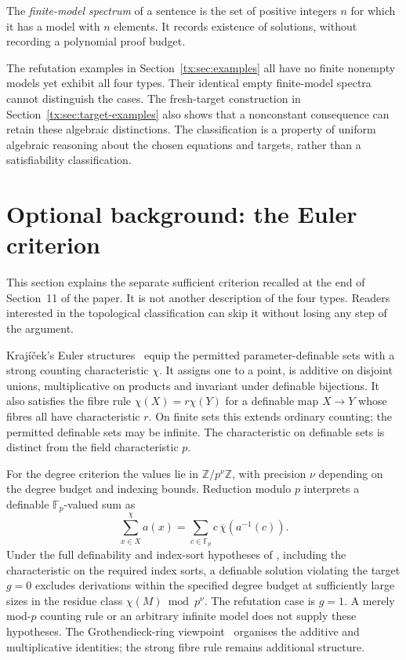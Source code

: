 \documentclass[11pt,a4paper,oneside,openany]{book}
\theoremstyle{definition}\newtheorem{definition}[theorem]{Definition}
\theoremstyle{remark}\newtheorem{remark}[theorem]{Remark}
\numberwithin{equation}{chapter}
\begin{document}
The \emph{finite-model spectrum} of a sentence is the set of positive
integers $n$ for which it has a model with $n$ elements. It records
existence of solutions, without recording a polynomial proof budget.

The refutation examples in Section~\ref{tx:sec:examples} all have no
finite nonempty models yet exhibit all four types. Their identical empty
finite-model spectra cannot distinguish the cases. The fresh-target
construction in Section~\ref{tx:sec:target-examples} also shows that a
nonconstant consequence can retain these algebraic distinctions. The
classification is a property of uniform algebraic reasoning about the
chosen equations and targets, rather than a satisfiability classification.

\section{Optional background: the Euler criterion}
\label{tx:sec:euler-background}
This section explains the separate sufficient criterion recalled at the
end of Section~11 of the paper. It is not another description of the
four types. Readers interested in the topological classification can
skip it without losing any step of the argument.

Kraj\'i\v cek's Euler structures~\cite{KrajEuler} equip the permitted
parameter-definable sets with a strong counting characteristic $\chi$.
It assigns one to a point, is additive on disjoint unions,
multiplicative on products and invariant under definable bijections.
It also satisfies the fibre rule $\chi(X)=r\chi(Y)$ for a definable
map $X\to Y$ whose fibres all have characteristic $r$. On finite sets
this extends ordinary counting; the permitted definable sets may be
infinite. The characteristic on definable sets is distinct from the
field characteristic $p$.

For the degree criterion the values lie in $\mathbb Z/p^\nu\mathbb Z$,
with precision $\nu$ depending on the degree budget and indexing bounds.
Reduction modulo $p$ interprets a definable $\mathbb F_p$-valued sum as
\[
 \sum_{x\in X}^{\chi}a(x)
       =\sum_{c\in\mathbb F_p}c\,\overline\chi(a^{-1}(c)).
\]
Under the full definability and index-sort hypotheses of
\cite[Theorem~6.1]{KrajEuler}, including the characteristic on the
required index sorts, a definable solution violating the target $g=0$
excludes derivations within the specified degree budget at sufficiently
large sizes in the residue class $\chi(M)\bmod p^\nu$.
The refutation case is $g=1$. A merely mod-$p$ counting rule or an
arbitrary infinite model does not supply these hypotheses. The
Grothendieck-ring viewpoint~\cite{KrajScanlon} organises the additive
and multiplicative identities; the strong fibre rule remains additional
structure.
\end{document}
